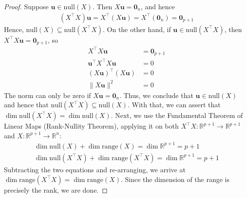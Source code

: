 \documentclass[12pt]{article}
\begin{document}
\begin{enumerate}
\begin{proof}
	Suppose $\mathbf{u}\in \text{null}(X)$. Then $X\mathbf{u}=\mathbf{0}_{n}$, and hence
	\begin{align*}
		(X^\top X)\mathbf{u}=X^\top(X\mathbf{u})=X^{\top}(\mathbf{0}_{n})=\mathbf{0}_{p+1}
	\end{align*}
	Hence, $\text{null}(X)\subseteq \text{null}(X^\top X)$. On the other hand,
	if $\mathbf{u}\in \text{null}(X^\top X)$, then $X^\top X\mathbf{u}=\mathbf{0}_{p+1}$,
	so
	\begin{align*}
		X^\top X\mathbf{u}&=\mathbf{0}_{p+1}\\
		\mathbf{u}^{\top}X^\top X\mathbf{u} &= 0\\
		(X \mathbf{u})^\top (X\mathbf{u})&=0\\
		\|X\mathbf{u}\|^2&=0
	\end{align*}
	The norm can only be zero if $X\mathbf{u}=\mathbf{0}_{n}$. Thus, we conclude
	that $\mathbf{u}\in\text{null}(X)$ and hence that $\text{null}(X^\top X)\subseteq \text{null}(X)$.
	With that, we can assert that $\dim \text{null}(X^\top X)=\dim\text{null}(X)$.
	Next, we use the Fundamental Theorem of Linear Maps (Rank-Nullity Theorem),
	applying it on both $X^\top X:\mathbb{R}^{p+1}\to\mathbb{R}^{p+1}$ and
	$X:\mathbb{R}^{p+1}\to\mathbb{R}^n$:
	\begin{align*}
		\dim\text{null}(X) + \dim\text{range}(X) = \dim\mathbb{R}^{p+1}=p+1\\
		\dim\text{null}(X^\top X) + \dim\text{range}(X^\top X) = \dim\mathbb{R}^{p+1}=p+1
	\end{align*}
	Subtracting the two equations and re-arranging, we arrive at
	$\dim\text{range}(X^\top X)=\dim\text{range}(X)$. Since the dimension of
	the range is precisely the rank, we are done.
\end{proof}




\end{enumerate}
\end{document}
